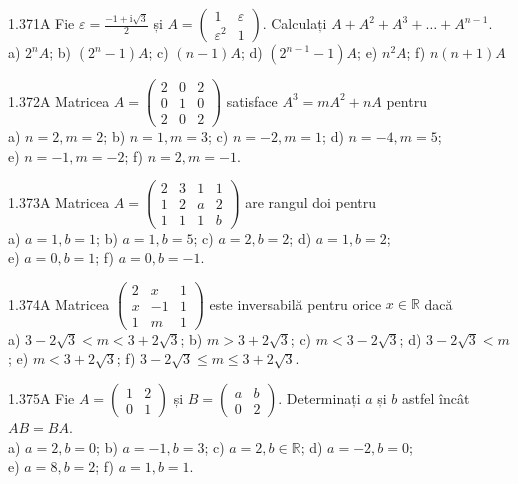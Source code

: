 \documentclass[11pt]{article}
\begin{document}
1.371A Fie $\varepsilon=\frac{-1+\mathrm{i} \sqrt{3}}{2}$ și $A=\left(\begin{array}{ll}1 & \varepsilon \\ \varepsilon^{2} & 1\end{array}\right)$. Calculați $A+A^{2}+A^{3}+\ldots+A^{n-1}$.\\ a) $2^{n} A$; b) $\left(2^{n}-1\right) A$; c) $(n-1) A$; d) $\left(2^{n-1}-1\right) A$; e) $n^{2} A$; f) $n(n+1) A$

1.372A Matricea $A=\left(\begin{array}{lll}2 & 0 & 2 \\ 0 & 1 & 0 \\ 2 & 0 & 2\end{array}\right)$ satisface $A^{3}=m A^{2}+n A$ pentru\\ a) $n=2, m=2$; b) $n=1, m=3$; c) $n=-2, m=1$; d) $n=-4, m=5$;\\ e) $n=-1, m=-2$; f) $n=2, m=-1$.

1.373A Matricea $A=\left(\begin{array}{llll}2 & 3 & 1 & 1 \\ 1 & 2 & a & 2 \\ 1 & 1 & 1 & b\end{array}\right)$ are rangul doi pentru\\ a) $a=1, b=1$; b) $a=1, b=5$; c) $a=2, b=2$; d) $a=1, b=2$;\\ e) $a=0, b=1$; f) $a=0, b=-1$.

1.374A Matricea $\left(\begin{array}{ccc}2 & x & 1 \\ x & -1 & 1 \\ 1 & m & 1\end{array}\right)$ este inversabilă pentru orice $x \in \mathbb{R}$ dacă\\ a) $3-2 \sqrt{3}<m<3+2 \sqrt{3}$; b) $m>3+2 \sqrt{3}$; c) $m<3-2 \sqrt{3}$; d) $3-2 \sqrt{3}<m$; e) $m<3+2 \sqrt{3}$; f) $3-2 \sqrt{3} \leq m \leq 3+2 \sqrt{3}$.

1.375A Fie $A=\left(\begin{array}{ll}1 & 2 \\ 0 & 1\end{array}\right)$ și $B=\left(\begin{array}{ll}a & b \\ 0 & 2\end{array}\right)$. Determinați $a$ și $b$ astfel încât $A B=B A$.\\ a) $a=2, b=0$; b) $a=-1, b=3$; c) $a=2, b \in \mathbb{R}$; d) $a=-2, b=0$;\\ e) $a=8, b=2$; f) $a=1, b=1$.
\end{document}
